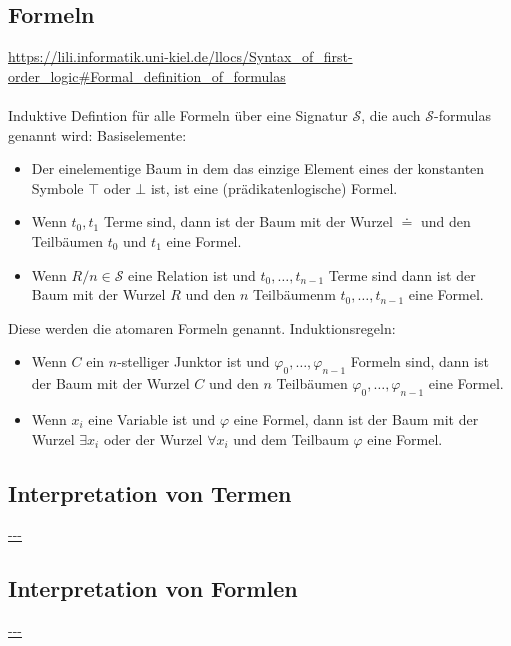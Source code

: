 \documentclass[twocolumn]{article}
\begin{document}
    \subsection{Formeln}
    \url{https://lili.informatik.uni-kiel.de/llocs/Syntax_of_first-order_logic#Formal_definition_of_formulas}\\\\
    Induktive Defintion für alle Formeln über eine Signatur $\mathcal{S}$, die auch $\mathcal{S}$-formulas genannt wird:
    Basiselemente:\\
    \begin{itemize}
        \item Der einelementige Baum in dem das einzige Element eines der konstanten Symbole $\top$ oder $\bot$ ist, ist eine (prädikatenlogische) Formel.
        \item Wenn $t_0,t_1$ Terme sind, dann ist der Baum mit der Wurzel $\doteq$ und den Teilbäumen $t_0$ und $t_1$ eine Formel.
        \item Wenn $R/n \in \mathcal S$ eine Relation ist und $t_0,\dots,t_{n-1}$ Terme sind dann ist der Baum mit der Wurzel $R$ und den $n$ Teilbäumenm $t_0, \dots, t_{n-1}$ eine Formel.
    \end{itemize}
    Diese werden die atomaren Formeln genannt.
    Induktionsregeln:\\
    \begin{itemize}
        \item Wenn $C$ ein $n$-stelliger Junktor ist und $\varphi_0,\dots,\varphi_{n-1}$ Formeln sind, dann ist der Baum mit der Wurzel $C$ und den $n$ Teilbäumen $\varphi_0,\dots,\varphi_{n-1}$ eine Formel.
        \item Wenn $x_i$ eine Variable ist und $\varphi$ eine Formel, dann ist der Baum mit der Wurzel $\exists x_i$ oder der Wurzel $\forall x_i$ und dem Teilbaum $\varphi$ eine Formel.
    \end{itemize}

    \subsection{Interpretation von Termen}
    \url{---}\\

    \subsection{Interpretation von Formlen}
    \url{---}\\
\end{document}
